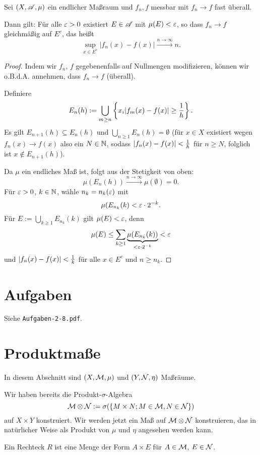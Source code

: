 \documentclass[
 a4paper,
 12pt,
 parskip=half
 ]{scrreprt}
\theoremstyle{plain}
\theoremstyle{definition}
\numberwithin{equation}{section}
\begin{document}
\begin{thm}[Jegorow]
 Sei $(X, \mathscr{A}, \mu)$ ein endlicher Maßraum und $f_n, f$ messbar mit $f_n \to f$ fast überall.
 
 Dann gilt: Für alle $\varepsilon > 0$ existiert $E \in \mathscr{A}$ mit $\mu(E) < \varepsilon$, so dass $f_n \to f$ gleichmäßig auf $E^c$, das heißt
 \[ \sup_{x \in E^c} | f_n(x) - f(x) | \xrightarrow{n \to \infty} n. \]
\end{thm}

\begin{proof}
 Indem wir $f_n$, $f$ gegebenenfalls auf Nullmengen modifizieren, können wir o.B.d.A. annehmen, dass $f_n \to f$ (überall).
 
 Definiere 
 \[ E_n(h) := \bigcup_{m \ge n} \left\{x_i | f_m(x) -f(x) | \ge \frac{1}{h} \right\}. \]
 Es gilt $E_{n+1}(h) \subseteq E_n(h)$ und $\bigcup_{n \ge 1} E_n(h) = \emptyset$ (für $x \in X$ existiert wegen $f_n(x) \to f(x)$ also ein $N \in \mathbb{N}$, sodass $| f_n(x) - f(x) | < \frac{1}{h}$ für $n \ge N$, folglich ist $x \notin E_{n+1}(h)$).
 
 Da $\mu$ ein endliches Maß ist, folgt aus der Stetigkeit von oben:
 \[ \mu( E_n(h) ) \xrightarrow{n \to \infty} \mu(\emptyset) = 0. \]
 Für $\varepsilon > 0$, $k \in \mathbb{N}$, wähle $n_k = n_k(\varepsilon)$ mit
 \[ \mu( E_{n_k}(k) < \varepsilon \cdot 2^{-k}. \]
 Für $E := \bigcup_{k \ge 1} E_{n_k}(k)$ gilt $\mu(E) < \varepsilon$, denn
 \[ \mu(E) \le \sum_{k\ge 1} \underbrace{\mu( E_{n_k}(k) )}_{< \varepsilon \cdot 2^{-k}} < \varepsilon \]
 und $| f_n(x) - f(x) | < \frac{1}{k}$ für alle $x \in E^c$ und $n \ge n_k$.
\end{proof}

\section{Aufgaben}
Siehe \verb+Aufgaben-2-8.pdf+.

\section{Produktmaße}
In diesem Abschnitt sind $(X, \mathcal{M}, \mu)$ und $(Y, \mathcal{N}, \eta)$ Maßräume.

Wir haben bereits die Produkt-$\sigma$-Algebra
\[ \mathcal{M} \otimes \mathcal{N} := \sigma( \{ M \times N; M \in \mathcal{M}, N \in \mathcal{N} \} ) \]
auf $X \times Y$ konstruiert. Wir werden jetzt ein Maß auf $\mathcal{M} \otimes \mathcal{N}$ konstruieren, das in natürlicher Weise als Produkt von $\mu$ und $\eta$ angesehen werden kann.

Ein Rechteck $R$ ist eine Menge der Form $A \times E$ für $A \in \mathcal{M}$, $E \in \mathcal{N}$.
\end{document}
